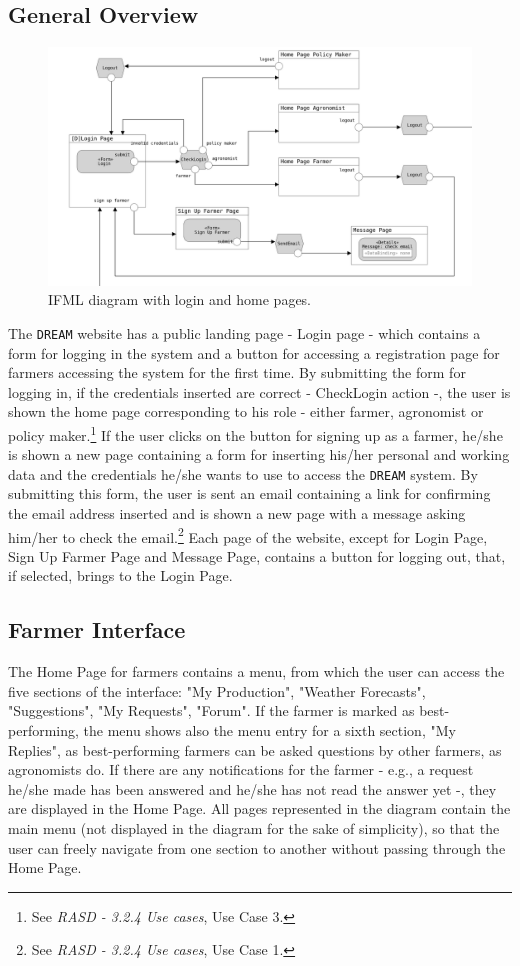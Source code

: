 \documentclass{article}
\begin{document}
\subsection {General Overview}
\begin{figure}[H]
   \centering
   \includegraphics[scale=0.15]{diagrams/ui diagrams/login.png}
    \caption{IFML diagram with login and home pages.}
\end{figure}
The \verb|DREAM| website has a public landing page - Login page - which contains a form for logging in the system and a button for accessing a registration page for farmers accessing the system for the first time.
By submitting the form for logging in, if the credentials inserted are correct - CheckLogin action -, the user is shown the home page corresponding to his role - either farmer, agronomist or policy maker.\footnote{See \textit{RASD - 3.2.4 Use cases}, Use Case 3.}
If the user clicks on the button for signing up as a farmer, he/she is shown a new page containing a form for inserting his/her personal and working data and the credentials he/she wants to use to access the \verb|DREAM| system. By submitting this form, the user is sent an email containing a link for confirming the email address inserted and is shown a new page with a message asking him/her to check the email.\footnote{See \textit{RASD - 3.2.4 Use cases}, Use Case 1.}
Each page of the website, except for Login Page, Sign Up Farmer Page and Message Page, contains a button for logging out, that, if selected, brings to the Login Page.
\newpage
\subsection{Farmer Interface}
The Home Page for farmers contains a menu, from which the user can access the five sections of the interface: "My Production", "Weather Forecasts", "Suggestions", "My Requests", "Forum".
If the farmer is marked as best-performing, the menu shows also the menu entry for a sixth section, "My Replies", as best-performing farmers can be asked questions by other farmers, as agronomists do.\newline
If there are any notifications for the farmer - e.g., a request he/she made has been answered and he/she has not read the answer yet -, they are displayed in the Home Page.\newline
All pages represented in the diagram contain the main menu (not displayed in the diagram for the sake of simplicity), so that the user can freely navigate from one section to another without passing through the Home Page. 
\end{document}
